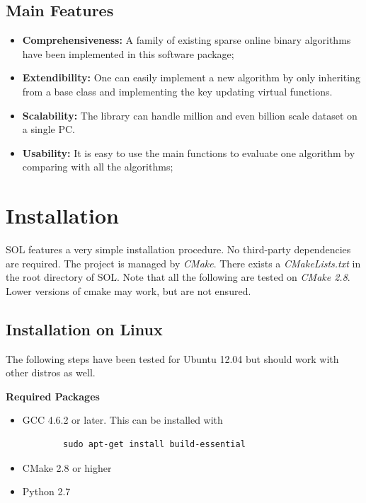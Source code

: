 \documentclass[11pt,a4paper]{article}
\newlength{\wideitemsep}
\let\olditem\item
\renewcommand{\item}{\setlength{\itemsep}{\wideitemsep}\olditem}
\begin{document}
\subsection{Main Features}
\begin{itemize}
    \item \textbf{Comprehensiveness:}
        A family of existing sparse online binary algorithms have been implemented in this software package;
    \item \textbf{Extendibility:}
        One can easily implement a new algorithm by only inheriting from a base
        class and implementing the key updating virtual functions.
    \item \textbf{Scalability:}
        The library can handle million and even billion scale dataset on a
        single PC.
    \item \textbf{Usability:}
        It is easy to use the main functions to evaluate one algorithm by comparing with all the algorithms;
\end{itemize}



\section{Installation}
SOL features a very simple installation procedure. No third-party dependencies
are required. The project is managed by \emph{CMake}. There
exists a \emph{CMakeLists.txt} in the root directory of SOL. Note that all the
following are tested on \emph{CMake 2.8}. Lower versions of cmake may work, but
are not ensured. 

\subsection{Installation on Linux}
The following steps have been tested for Ubuntu 12.04 but should work with
other distros as well.

\vspace{2mm}\hspace{-5mm}\textbf{Required Packages}

\begin{itemize}[leftmargin=1cm]
    \item GCC 4.6.2 or later. This can be installed with 
        \lstset{language=bash,
        }
        \begin{lstlisting}
        sudo apt-get install build-essential
        \end{lstlisting}
    \item CMake 2.8 or higher
    \item Python 2.7 
\end{itemize}
\end{document}
